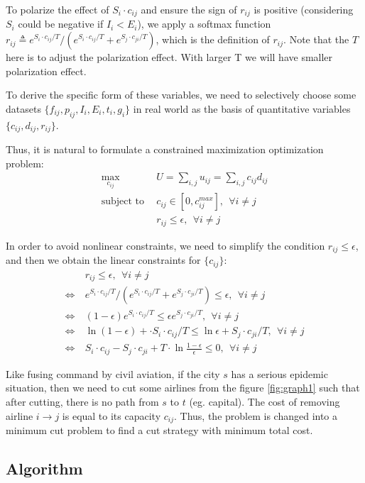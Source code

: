 To polarize the effect of $S_i \cdot c_{ij}$ and ensure the sign of $r_{ij}$ is positive (considering $S_i$ could be negative if $I_i < E_i$), we apply a softmax function $r_{ij} \triangleq e^{S_i \cdot c_{ij} / T} / (e^{S_i \cdot c_{ij} / T} + e^{S_j \cdot c_{ji} / T})$, which is the definition of $r_{ij}$. Note that the $T$ here is to adjust the polarization effect. With larger T we will have smaller polarization effect.

To derive the specific form of these variables, we need to selectively choose some datasets $\{ f_{ij},p_{ij}, I_i, E_i, t_i, g_i \}$ in real world as the basis of quantitative variables $\{ c_{ij},d_{ij}, r_{ij} \}$. 

Thus, it is natural to formulate a constrained maximization optimization problem:
\begin{align*}
    \max_{c_{ij}}~& U = \sum_{i,j} u_{ij} = \sum_{i,j} c_{ij}d_{ij}\\
    \text{subject to}~~& c_{ij} \in [0, c_{ij}^{max}],~~ \forall i \neq j \\
    & r_{ij} \le \epsilon,~~ \forall i \neq j 
\end{align*}

In order to avoid nonlinear constraints, we need to simplify the condition $r_{ij} \le \epsilon$, and then we obtain the linear constraints for $\{c_{ij}\}$:
\begin{equation*}
    \begin{aligned}
     & r_{ij} \le \epsilon,~~ \forall i \neq j \\
     \Leftrightarrow~& e^{S_i \cdot c_{ij} / T} / (e^{S_i \cdot c_{ij} / T} + e^{S_j \cdot c_{ji} / T}) \le \epsilon,~~ \forall i \neq j \\
     \Leftrightarrow~& (1-\epsilon) e^{S_i \cdot c_{ij} / T} \le \epsilon e^{S_j \cdot c_{ji} / T},~~ \forall i \neq j \\
     \Leftrightarrow~& \ln{(1-\epsilon)} + \cdot S_i \cdot c_{ij} / T \le \ln{\epsilon} + S_j \cdot c_{ji} / T,~~ \forall i \neq j \\
     \Leftrightarrow~& S_i \cdot c_{ij} - S_j \cdot c_{ji} + T \cdot \ln{\frac{1-\epsilon}{\epsilon}} \le 0,~~ \forall i \neq j
    \end{aligned}
\end{equation*}


Like fusing command by civil aviation, if the city $s$ has a serious epidemic situation, then we need to cut some airlines from the figure \ref{fig:graph1} such that
after cutting, there is no path from $s$ to $t$ (eg. capital). The cost of removing airline $i\rightarrow j$ is equal to its capacity $c_{ij}$. Thus, the problem is changed into a minimum cut problem to find a cut strategy with minimum total cost. 







\subsection{Algorithm}
